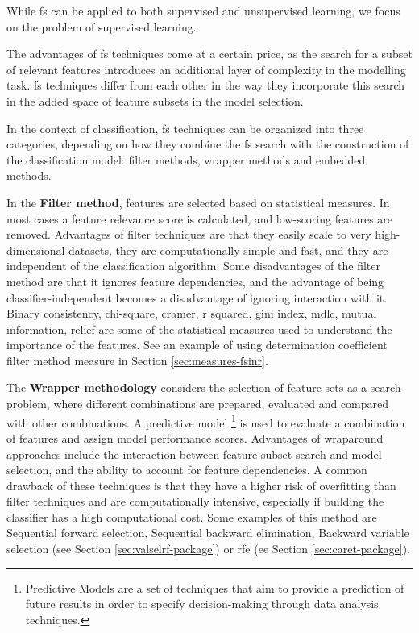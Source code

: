While \acrshort{fs} can be applied to both supervised and unsupervised learning, we focus on the problem of supervised learning.

The advantages of \acrshort{fs} techniques come at a certain price, as the search for a subset of relevant features introduces an additional layer of complexity in the modelling task. \acrshort{fs} techniques differ from each other in the way they incorporate this search in the added space of feature subsets in the model selection.

In the context of classification, \acrshort{fs} techniques can be organized into three categories, depending on how they combine the \acrlong{fs} search with the construction of the classification model: filter methods, wrapper methods and embedded methods.

In the \textbf{Filter method}, features are selected based on statistical measures. In most cases a feature relevance score is calculated, and low-scoring features are removed. Advantages of filter techniques are that they easily scale to very high-dimensional datasets, they are computationally simple and fast, and they are independent of the classification algorithm. Some disadvantages of the filter method are that it ignores feature dependencies, and the advantage of being classifier-independent becomes a disadvantage of ignoring interaction with it. Binary consistency, chi-square, cramer, r squared, gini index, \acrlong{mdlc}, mutual information, relief are some of the statistical measures used to understand the importance of the features. See an example of using determination coefficient filter method measure in Section \ref{sec:measures-fsinr}.

The \textbf{Wrapper methodology} considers the selection of feature sets as a search problem, where different combinations are prepared, evaluated and compared with other combinations. A predictive model \footnote{Predictive Models are a set of techniques that aim to provide a prediction of future results in order to specify decision-making through data analysis techniques.} is used to evaluate a combination of features and assign model performance scores. Advantages of wraparound approaches include the interaction between feature subset search and model selection, and the ability to account for feature dependencies. A common drawback of these techniques is that they have a higher risk of overfitting than filter techniques and are computationally intensive, especially if building the classifier has a high computational cost. Some examples of this method are Sequential forward selection, Sequential backward elimination, Backward variable selection (see Section \ref{sec:valselrf-package}) or \acrfull{rfe} (ee Section \ref{sec:caret-package}).

